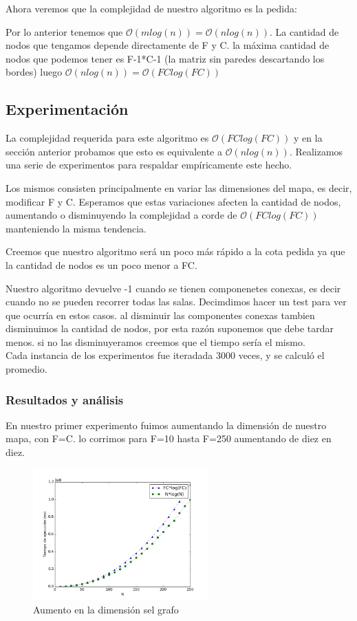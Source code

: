 \documentclass[spanish,12pt]{article}
\begin{document}
Ahora veremos que la complejidad de nuestro algoritmo es la pedida:

Por lo anterior tenemos que $\mathcal{O}(mlog(n))= \mathcal{O}(nlog(n))$.
La cantidad de nodos que tengamos depende directamente de F y C. la máxima cantidad de nodos que podemos tener es F-1*C-1 (la matriz sin paredes descartando los bordes) luego $\mathcal{O}(nlog(n)) = \mathcal{O}(FClog(FC))$


\subsection{Experimentación}

La complejidad requerida para este algoritmo es $\mathcal{O}(FClog(FC))$ y en la sección anterior probamos que esto es equivalente a  $\mathcal{O}(nlog(n))$.
Realizamos una serie de experimentos para respaldar empíricamente este hecho.

Los mismos consisten principalmente en variar las dimensiones del mapa, es decir, modificar F y C. Esperamos que estas variaciones afecten la cantidad de nodos, aumentando o disminuyendo la complejidad a corde de $\mathcal{O}(FClog(FC))$ manteniendo la misma tendencia.

Creemos que nuestro algoritmo será un poco más rápido a la cota pedida ya que la cantidad de nodos es un poco menor a FC.

Nuestro algoritmo devuelve -1 cuando se tienen componenetes conexas, es decir cuando no se pueden recorrer todas las salas. Decimdimos hacer un test para ver que ocurría en estos casos. al disminuir las componentes conexas tambien disminuimos la cantidad de nodos, por esta razón suponemos que debe tardar menos. si no las disminuyeramos creemos que el tiempo sería el mismo.
\\
Cada instancia de los experimentos fue iteradada 3000 veces, y se calculó el promedio.
\subsubsection{Resultados y análisis}

En nuestro primer experimento fuimos aumentando la dimensión de nuestro mapa, con F=C. lo corrimos para F=10 hasta F=250 aumentando de diez en diez.

\begin{figure}[H]
\centering
\includegraphics[width=0.6\textwidth]{sinParedes}
\caption{Aumento en la dimensión sel grafo}
\end{figure}
\end{document}
